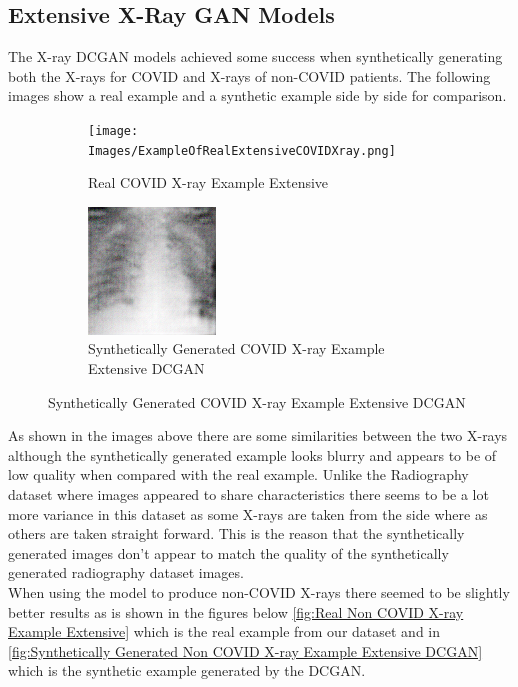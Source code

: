 \subsection{Extensive X-Ray GAN Models}
The X-ray DCGAN models achieved some success when synthetically generating both the X-rays for COVID and X-rays of non-COVID patients.  The following images show a real example and a synthetic example side by side for comparison.
 \begin{figure}[H]
    \centering
    \begin{subfigure}{.4\textwidth}
    \centering
      \texttt{[image: Images/ExampleOfRealExtensiveCOVIDXray.png]}
      \caption{Real COVID X-ray Example Extensive}
      \label{fig:Real COVID X-ray Example Extensive}
    \end{subfigure}\hfill%
    \begin{subfigure}{.4\textwidth}
    \centering
      \includegraphics[width=.4\linewidth,keepaspectratio]{Images/ExampleOfSyntheticallyGeneratedCOVIDXrayExtensiveDCGAN.png}
      \caption{Synthetically Generated COVID X-ray Example Extensive DCGAN}
      \label{fig:Synthetically Generated COVID X-ray Example Extensive DCGAN}
    \end{subfigure}\hfill%
\end{figure}
As shown in the images above there are some similarities between the two X-rays although the synthetically generated example looks blurry and appears to be of low quality when compared with the real example.  Unlike the Radiography dataset where images appeared to share characteristics there seems to be a lot more variance in this dataset as some X-rays are taken from the side where as others are taken straight forward.  This is the reason that the synthetically generated images don't appear to match the quality of the synthetically generated radiography dataset images.
\\
When using the model to produce non-COVID X-rays there seemed to be slightly better results as is shown in the figures below \ref{fig:Real Non COVID X-ray Example Extensive} which is the real example from our dataset and in \ref{fig:Synthetically Generated Non COVID X-ray Example Extensive DCGAN} which is the synthetic example generated by the DCGAN.
